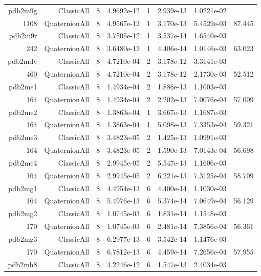 \begin{xltabular}{\textwidth}{r|rcS[table-format=1.4e+2]cS[table-format=1.3e+2]S[table-format=1.4e+2]S[table-format=-1.3]}
pdb2m9g & ClassicAll & 8 & 4.9692e-12 & 1 & 2.939e-13 & 1.0221e-02 & \\
1108 & QuaternionAll & 8 & 4.9567e-12 & 1 & 3.170e-13 & 5.4529e-03 & 87.445\\  \addlinespace
pdb2m9r & ClassicAll & 8 & 3.7505e-12 & 1 & 3.537e-14 & 1.6540e-03 & \\
242 & QuaternionAll & 8 & 3.6480e-12 & 1 & 4.406e-14 & 1.0146e-03 & 63.023\\  \addlinespace
pdb2mdv & ClassicAll & 8 & 4.7210e-04 & 2 & 3.178e-12 & 3.3141e-03 & \\
460 & QuaternionAll & 8 & 4.7210e-04 & 2 & 3.178e-12 & 2.1730e-03 & 52.512\\  \addlinespace
pdb2me1 & ClassicAll & 8 & 1.4934e-04 & 2 & 1.886e-13 & 1.1003e-03 & \\
164 & QuaternionAll & 8 & 1.4934e-04 & 2 & 2.202e-13 & 7.0076e-04 & 57.009\\  \addlinespace
pdb2me2 & ClassicAll & 8 & 1.3863e-04 & 1 & 3.667e-13 & 1.1687e-03 & \\
164 & QuaternionAll & 8 & 1.3863e-04 & 1 & 5.098e-13 & 7.3353e-04 & 59.321\\  \addlinespace
pdb2me3 & ClassicAll & 8 & 3.4823e-05 & 2 & 1.425e-13 & 1.0991e-03 & \\
164 & QuaternionAll & 8 & 3.4823e-05 & 2 & 1.590e-13 & 7.0143e-04 & 56.698\\  \addlinespace
pdb2me4 & ClassicAll & 8 & 2.9945e-05 & 2 & 5.547e-13 & 1.1606e-03 & \\
164 & QuaternionAll & 8 & 2.9945e-05 & 2 & 6.221e-13 & 7.3125e-04 & 58.709\\  \addlinespace
pdb2mg1 & ClassicAll & 8 & 4.4954e-13 & 6 & 4.400e-14 & 1.1030e-03 & \\
164 & QuaternionAll & 8 & 5.4976e-13 & 6 & 5.374e-14 & 7.0649e-04 & 56.129\\  \addlinespace
pdb2mg2 & ClassicAll & 8 & 1.0745e-03 & 6 & 1.831e-14 & 1.1548e-03 & \\
170 & QuaternionAll & 8 & 1.0745e-03 & 6 & 2.481e-14 & 7.3856e-04 & 56.361\\  \addlinespace
pdb2mg3 & ClassicAll & 8 & 6.2977e-13 & 6 & 3.542e-14 & 1.1476e-03 & \\
170 & QuaternionAll & 8 & 6.7812e-13 & 6 & 4.459e-14 & 7.2656e-04 & 57.955\\  \addlinespace
pdb2mh8 & ClassicAll & 8 & 4.2246e-12 & 6 & 1.547e-13 & 2.4034e-03 & \\

\end{xltabular}
